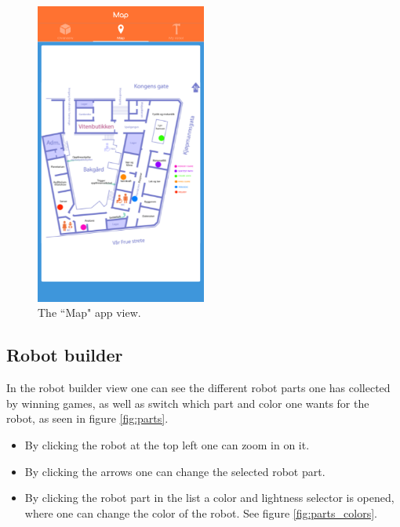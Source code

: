 \begin{figure}[H]
    \centering
    \includegraphics[width=0.5\textwidth]{images/app/Map.png}
    \caption{The ``Map" app view.}
    \label{fig:map}
\end{figure}

\subsection{Robot builder}
In the robot builder view one can see the different robot parts one has collected by winning games, as well as switch which part and color one wants for the robot, as seen in figure \ref{fig:parts}.

\begin{itemize}
    \item By clicking the robot at the top left one can zoom in on it.
    \item By clicking the arrows one can change the selected robot part.
    \item By clicking the robot part in the list a color and lightness selector is opened, where one can change the color of the robot. See figure \ref{fig:parts_colors}.
\end{itemize}




